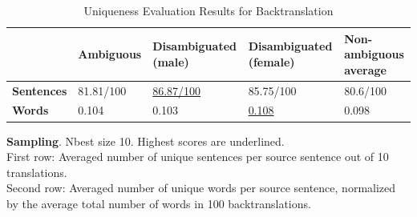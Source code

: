\begin{table}[!htb]
    \begin{subtable}{\textwidth}
        \centering
        \begin{tabularx}{\linewidth}{|X|XXXX|}
            \hline
             & \textbf{Ambiguous} & \textbf{Disambiguated (male)} & \textbf{Disambiguated (female)} & \textbf{Non-ambiguous average} \\ \hline
             \textbf{Sentences} & 81.81/100 & \underline{86.87/100} & 85.75/100 & 80.6/100 \\ 
             \textbf{Words} & 0.104 & 0.103 & \underline{0.108} & 0.098 \\ \hline
        \end{tabularx}
        \caption{\textbf{Sampling}. Nbest size 10. Highest scores are underlined. \\ First row: Averaged number of unique sentences per source sentence out of 10 translations. \\ Second row: Averaged number of unique words per source sentence, normalized by the average total number of words in 100 backtranslations.}
        \label{tab:uniqueness_backtranslation_sampling}
    \end{subtable}

    \caption{Uniqueness Evaluation Results for Backtranslation}
    \label{tab:uniqueness_backtranslation}
\end{table}

